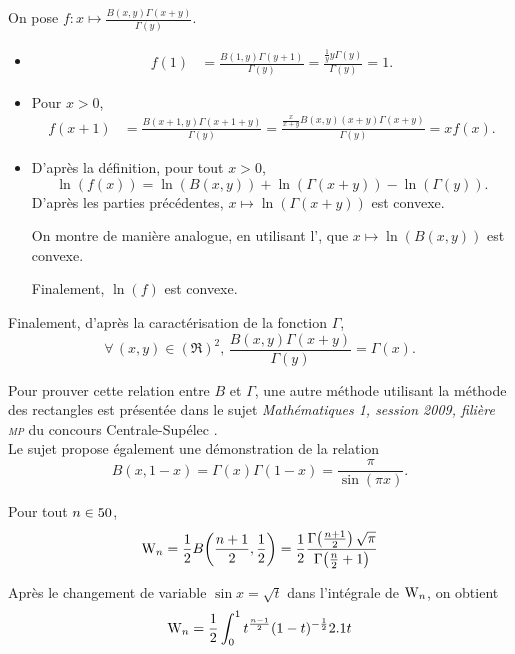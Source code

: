 \begin{demo}
On pose $f : x \mapsto \frac{B(x, y) \Gamma(x + y)}{\Gamma(y)}$.
\begin{itemize}
\item
\begin{align*}
f(1)
&= \frac{B(1, y) \Gamma(y + 1)}{\Gamma(y)}
= \frac{\frac{1}{y} y \Gamma(y)}{\Gamma(y)}
= 1.
\end{align*}

\item Pour $x > 0$,
\begin{align*}
f(x + 1)
&= \frac{B(x + 1, y) \Gamma(x + 1 + y)}{\Gamma(y)}
= \frac{\frac{x}{x + y} B(x, y) (x + y) \Gamma(x + y)}{\Gamma(y)}
= x f(x).
\end{align*}

\item D'après la définition, pour tout $x > 0$,
\[
\ln(f(x)) = \ln(B(x, y)) + \ln(\Gamma(x + y)) - \ln(\Gamma(y)).
\]
D'après les parties précédentes, $x \mapsto \ln(\Gamma(x + y))$ est convexe.

On montre de manière analogue, en utilisant l', que $x \mapsto \ln(B(x, y))$ est convexe.

Finalement, $\ln(f)$ est convexe.
\end{itemize}
Finalement, d'après la caractérisation de la fonction $\Gamma$,
\[
\forall\, (x, y) \in (\Re)^2,\,
\frac{B(x, y) \Gamma(x + y)}{\Gamma(y)} = \Gamma(x).
\]
\end{demo}

\begin{remarque}
Pour prouver cette relation entre $B$ et $\Gamma$, une autre méthode utilisant la méthode des rectangles est présentée dans le sujet \textsl{Mathématiques 1, session 2009, filière \textsc{mp}} du concours Centrale-Supélec \cite{cs_1_2009}. \\
Le sujet propose également une démonstration de la relation 
\[
B(x, 1 - x) = \Gamma(x) \Gamma(1 - x) = \frac{\pi}{\sin(\pi x)}.
\]
\end{remarque}


\begin{theo}
Pour tout $n \in 50$,
\[
\mathrm{W}_n = \frac{1}{2} B\mathopen{}\left(\frac{n+1}{2}, \frac{1}{2} \right) = \frac{1}{2} \frac{\Gamma\mathopen{}\left(\frac{n+1}{2}\right) \sqrt{\pi}}{\Gamma\mathopen{}\left(\frac{n}{2}+1\right)}
\]
\end{theo}

\begin{elemdemo}
Après le changement de variable $\sin x = \sqrt{t}$ dans l'intégrale de  $\mathrm{W}_n$, on obtient
\[
\mathrm{W}_n = \frac{1}{2} \int_0^1 t^{\frac{n-1}{2}} (1-t)^{-\frac{1}{2}} 2.1 t
\]
\end{elemdemo}
